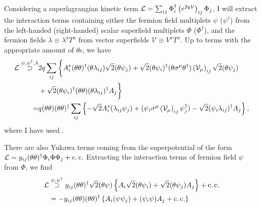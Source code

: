 \documentclass[../main.tex]{subfiles}
\begin{document}
Considering a superlagrangian kinetic term \(\mathcal{L} = \sum_{ij} \Phi^\dagger_i
\left(e^{2q \mathcal{V}}\right)_{ij} \Phi_j\), I will extract the interaction
terms containing either the fermion field multiplets \(\psi\) (\(\psi^\dagger\)) from the left-handed (right-handed) scalar superfield multiplets \(\Phi\) (\(\Phi^\dagger\)),
and the fermion fields \(\lambda \equiv \lambda^a T^a\) from vector superfields \(\mathcal{V} \equiv V^a T^a\).
Up to terms with the appropriate amount of \(\theta\)s, we have
\begin{align}
  \label{susy:eq:psi_kin_int}
  \nonumber
  \mathcal{L} \stackrel{\psi, \psi^\dagger, \lambda}{\supset} & 2q \sum_{ij} \bigg\{ A^\ast_i (\theta\theta)^\dagger (\theta\lambda_{ij}) \sqrt{2} (\theta\psi_j) + \sqrt{2} (\theta\psi_i)^\dagger (\theta\sigma^\mu\theta^\dagger) \left(\mathcal{V}_\mu\right)_{ij} \sqrt{2} (\theta\psi_j) \\
  \nonumber
                                                     & + \sqrt{2} (\theta\psi_i)^\dagger (\theta\theta) (\theta\lambda_{ij})^\dagger A_j \bigg\}                                                                                                                                   \\
  =                                                  & q(\theta\theta)(\theta\theta)^\dagger \sum_{ij} \left\{ -\sqrt{2} A^\ast_i (\lambda_{ij}\psi_j) + (\psi_i \sigma^\mu \left(\mathcal{V}_\mu\right)_{ij} \psi^\dagger_j) - \sqrt{2} (\psi_i\lambda_{ij})^\dagger A_j \right\},
\end{align}
where I have used . 
\medskip

There are also Yukawa terms coming from the superpotential of the form \(\mathcal{L} =
y_{ij} (\theta\theta)^\dagger \Phi_i \Phi \Phi_j + \operatorname{c.c.}\) Extracting the
interaction terms of fermion field \(\psi\) from \(\Phi\), we find
\begin{align}
  \label{susy:eq:psi_yuk_int}
  \nonumber
  \mathcal{L} & \stackrel{\psi, \psi^\dagger}{\supset} y_{ij} (\theta\theta)^\dagger \sqrt{2} (\theta\psi) \left\{ A_i \sqrt{2}(\theta\psi_i) + \sqrt{2}(\theta\psi_j)A_j \right\} + \operatorname{c.c.} \\
     & = -y_{ij} (\theta\theta)(\theta\theta)^\dagger \left\{ A_i(\psi\psi_j) + (\psi_i\psi)A_j + \operatorname{c.c.} \right\}
\end{align}
\end{document}
